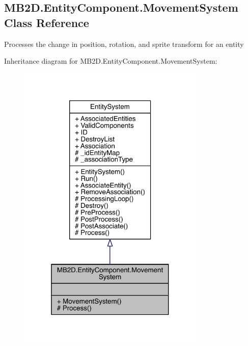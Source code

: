 \hypertarget{class_m_b2_d_1_1_entity_component_1_1_movement_system}{}\subsection{M\+B2\+D.\+Entity\+Component.\+Movement\+System Class Reference}
\label{class_m_b2_d_1_1_entity_component_1_1_movement_system}


Processes the change in position, rotation, and sprite transform for an entity  




Inheritance diagram for M\+B2\+D.\+Entity\+Component.\+Movement\+System\+:
\nopagebreak
\begin{figure}[H]
\begin{center}
\leavevmode
\includegraphics[width=253pt]{class_m_b2_d_1_1_entity_component_1_1_movement_system__inherit__graph}
\end{center}
\end{figure}


